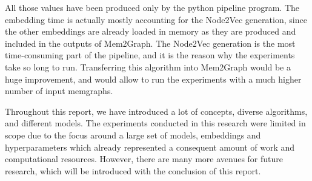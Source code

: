 All those values have been produced only by the python pipeline program. The embedding time is actually mostly accounting for the Node2Vec generation, since the other embeddings are already loaded in memory as they are produced and included in the outputs of Mem2Graph. The Node2Vec generation is the most time-consuming part of the pipeline, and it is the reason why the experiments take so long to run. Transferring this algorithm into Mem2Graph would be a huge improvement, and would allow to run the experiments with a much higher number of input memgraphs.

Throughout this report, we have introduced a lot of concepts, diverse algorithms, and different models. The experiments conducted in this research were limited in scope due to the focus around a large set of models, embeddings and hyperparameters which already represented a consequent amount of work and computational resources. However, there are many more avenues for future research, which will be introduced with the conclusion of this report.
